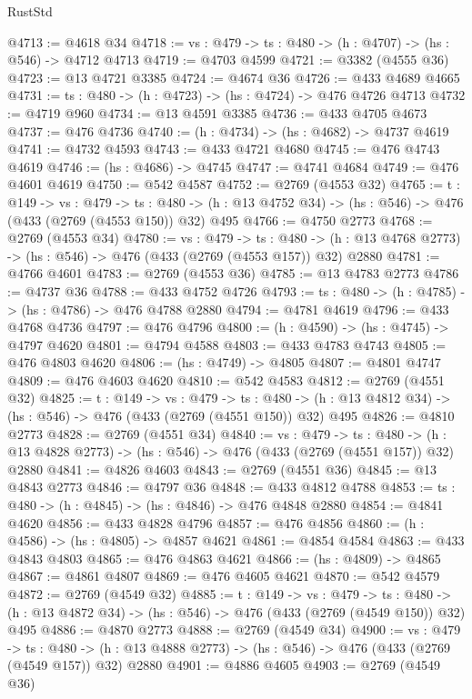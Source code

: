 \begin{lexlean}{RustStd}
\begin{coremodule}
@4713 := @4618 @34
@4718 := {vs : @479} -> {ts : @480} -> (h : @4707) -> (hs : @546) -> @4712 @4713
@4719 := @4703 @4599
@4721 := @3382 (@4555 @36)
@4723 := @13 @4721 @3385
@4724 := @4674 @36
@4726 := @433 @4689 @4665
@4731 := {ts : @480} -> (h : @4723) -> (hs : @4724) -> @476 @4726 @4713
@4732 := @4719 @960
@4734 := @13 @4591 @3385
@4736 := @433 @4705 @4673
@4737 := @476 @4736
@4740 := (h : @4734) -> (hs : @4682) -> @4737 @4619
@4741 := @4732 @4593
@4743 := @433 @4721 @4680
@4745 := @476 @4743 @4619
@4746 := (hs : @4686) -> @4745
@4747 := @4741 @4684
@4749 := @476 @4601 @4619
@4750 := @542 @4587
@4752 := @2769 (@4553 @32)
@4765 := {t : @149} ->
  {vs : @479} ->
  {ts : @480} -> (h : @13 @4752 @34) -> (hs : @546) -> @476 (@433 (@2769 (@4553 @150)) @32) @495
@4766 := @4750 @2773
@4768 := @2769 (@4553 @34)
@4780 := {vs : @479} ->
  {ts : @480} -> (h : @13 @4768 @2773) -> (hs : @546) -> @476 (@433 (@2769 (@4553 @157)) @32) @2880
@4781 := @4766 @4601
@4783 := @2769 (@4553 @36)
@4785 := @13 @4783 @2773
@4786 := @4737 @36
@4788 := @433 @4752 @4726
@4793 := {ts : @480} -> (h : @4785) -> (hs : @4786) -> @476 @4788 @2880
@4794 := @4781 @4619
@4796 := @433 @4768 @4736
@4797 := @476 @4796
@4800 := (h : @4590) -> (hs : @4745) -> @4797 @4620
@4801 := @4794 @4588
@4803 := @433 @4783 @4743
@4805 := @476 @4803 @4620
@4806 := (hs : @4749) -> @4805
@4807 := @4801 @4747
@4809 := @476 @4603 @4620
@4810 := @542 @4583
@4812 := @2769 (@4551 @32)
@4825 := {t : @149} ->
  {vs : @479} ->
  {ts : @480} -> (h : @13 @4812 @34) -> (hs : @546) -> @476 (@433 (@2769 (@4551 @150)) @32) @495
@4826 := @4810 @2773
@4828 := @2769 (@4551 @34)
@4840 := {vs : @479} ->
  {ts : @480} -> (h : @13 @4828 @2773) -> (hs : @546) -> @476 (@433 (@2769 (@4551 @157)) @32) @2880
@4841 := @4826 @4603
@4843 := @2769 (@4551 @36)
@4845 := @13 @4843 @2773
@4846 := @4797 @36
@4848 := @433 @4812 @4788
@4853 := {ts : @480} -> (h : @4845) -> (hs : @4846) -> @476 @4848 @2880
@4854 := @4841 @4620
@4856 := @433 @4828 @4796
@4857 := @476 @4856
@4860 := (h : @4586) -> (hs : @4805) -> @4857 @4621
@4861 := @4854 @4584
@4863 := @433 @4843 @4803
@4865 := @476 @4863 @4621
@4866 := (hs : @4809) -> @4865
@4867 := @4861 @4807
@4869 := @476 @4605 @4621
@4870 := @542 @4579
@4872 := @2769 (@4549 @32)
@4885 := {t : @149} ->
  {vs : @479} ->
  {ts : @480} -> (h : @13 @4872 @34) -> (hs : @546) -> @476 (@433 (@2769 (@4549 @150)) @32) @495
@4886 := @4870 @2773
@4888 := @2769 (@4549 @34)
@4900 := {vs : @479} ->
  {ts : @480} -> (h : @13 @4888 @2773) -> (hs : @546) -> @476 (@433 (@2769 (@4549 @157)) @32) @2880
@4901 := @4886 @4605
@4903 := @2769 (@4549 @36)

\end{coremodule}
\end{lexlean}
